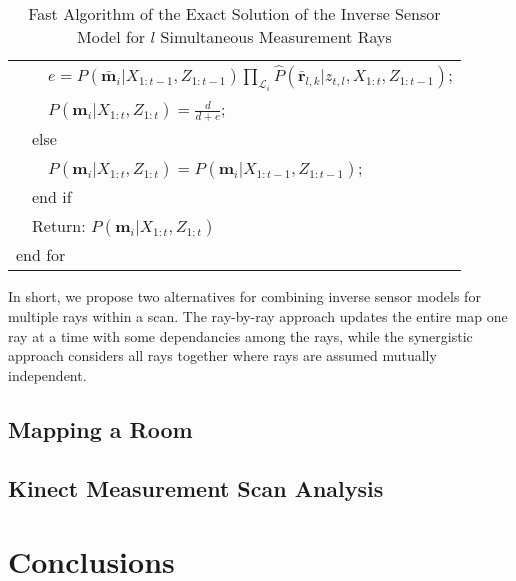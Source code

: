 \begin{table}
\begin{tabular}{ l }
   \ \ \ \ $e=P(\bar{\mathbf{m}}_i|X_{1:t-1},Z_{1:t-1})\prod_{\mathcal L_i}\hat P(\bar{\mathbf{r}}_{l,k}|z_{t,l},X_{1:t},Z_{1:t-1})$;\\
   \ \ \ \ $P(\mathbf{m}_i|X_{1:t},Z_{1:t})=\frac{d}{d+e}$;\\
   \ \ else\\
   \ \ \ \ $P(\mathbf{m}_i|X_{1:t},Z_{1:t})=P(\mathbf{m}_i|X_{1:t-1},Z_{1:t-1});$\\
   \ \ end if\\
   \ \ Return: $P(\mathbf{m}_i|X_{1:t},Z_{1:t})$\\
   end for\\

\end{tabular}
\caption{Fast Algorithm of the Exact Solution of the Inverse Sensor Model for $l$ Simultaneous Measurement Rays}
\label{tab:Alg_ISM_2D}
\end{table}





In short, we propose two alternatives for combining inverse sensor models for multiple rays within a scan. The ray-by-ray approach updates the entire map one ray at a time with some dependancies among the rays, while the synergistic approach considers all rays together where rays are assumed mutually independent.






%

\subsection{Mapping a Room}

\subsection{Kinect Measurement Scan Analysis}



\section{Conclusions}

